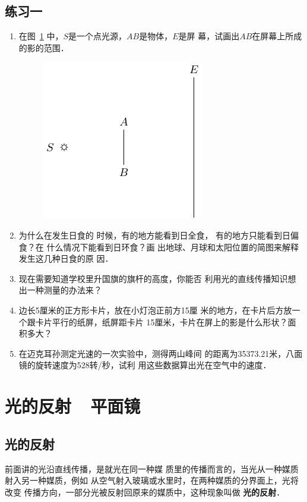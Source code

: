 \subsection*{练习一}
\begin{enumerate}
    \item 在图~\ref{fig_C_5-6} 中，$S$是一个点光源，$AB$是物体，$E$是屏
幕，试画出$AB$在屏幕上所成
的影的范围．
\begin{figure}[htbp]
    \centering
    \includegraphics{fig/C/5-6.pdf}
    \caption{}\label{fig_C_5-6}
\end{figure}


\item 为什么在发生日食的
时候，有的地方能看到日全食，
有的地方只能看到日偏食？在
什么情况下能看到日环食？画
出地球、月球和太阳位置的简图来解释发生这几种日食的原
因．
\item 现在需要知道学校里升国旗的旗杆的高度，你能否
利用光的直线传播知识想出一种测量的办法来？
\item 边长5厘米的正方形卡片，放在小灯泡正前方15厘
米的地方，在卡片后方放一个跟卡片平行的纸屏，纸屏距卡片
15厘米，卡片在屏上的影是什么形状？面积多大？
\item 在迈克耳孙测定光速的一次实验中，测得两山峰间
的距离为35373.21米，八面镜的旋转速度为528转/秒，试利
用这些数据算出光在空气中的速度．
\end{enumerate}

\section{光的反射~~平面镜}
\subsection{光的反射}
前面讲的光沿直线传播，是就光在同一种媒
质里的传播而言的，当光从一种媒质射入另一种媒质，例如
从空气射入玻璃或水里时，在两种媒质的分界面上，光将改变
传播方向，一部分光被反射回原来的媒质中，这种现象叫做
\textbf{光的反射}．

